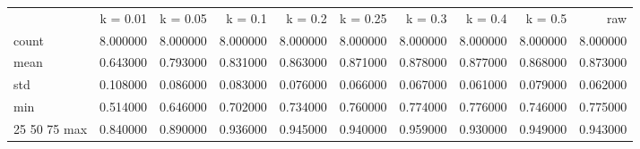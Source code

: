 \begin{tabular}{lrrrrrrrrr}
 & k = 0.01 & k = 0.05 &  k = 0.1 & k = 0.2 & k = 0.25 & k = 0.3 & k = 0.4 & k = 0.5 & raw \\
count & 8.000000 & 8.000000 & 8.000000 & 8.000000 & 8.000000 & 8.000000 & 8.000000 & 8.000000 & 8.000000 \\
mean & 0.643000 & 0.793000 & 0.831000 & 0.863000 & 0.871000 & 0.878000 & 0.877000 & 0.868000 & 0.873000 \\
std & 0.108000 & 0.086000 & 0.083000 & 0.076000 & 0.066000 & 0.067000 & 0.061000 & 0.079000 & 0.062000 \\
min & 0.514000 & 0.646000 & 0.702000 & 0.734000 & 0.760000 & 0.774000 & 0.776000 & 0.746000 & 0.775000 \\
25%
50%
75%
max & 0.840000 & 0.890000 & 0.936000 & 0.945000 & 0.940000 & 0.959000 & 0.930000 & 0.949000 & 0.943000 \\
\end{tabular}
